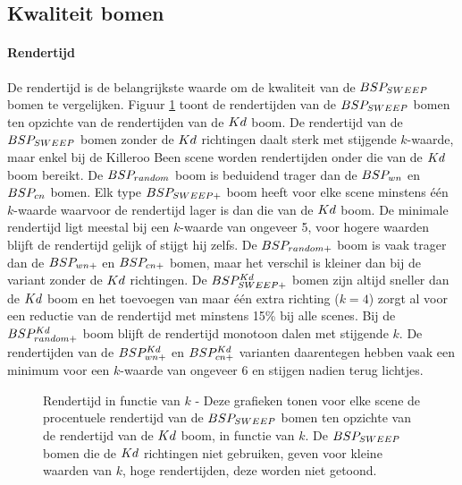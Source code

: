 \subsection{Kwaliteit bomen}
\label{h5-richtingen-kwaliteit}
\paragraph{Rendertijd}
De rendertijd is de belangrijkste waarde om de kwaliteit van de $BSP_{SWEEP}$ bomen te vergelijken. Figuur \ref{fig:k-rendertijd} toont de rendertijden van de $BSP_{SWEEP}$ bomen ten opzichte van de rendertijden van de $Kd$ boom.
De rendertijd van de $BSP_{SWEEP}$ bomen zonder de $Kd$ richtingen daalt sterk met stijgende $k$-waarde, maar enkel bij de Killeroo Been scene worden rendertijden onder die van de $Kd$ boom bereikt.
De $BSP_{random}$ boom is beduidend trager dan de $BSP_{wn}$ en $BSP_{cn}$ bomen.
Elk type $BSP_{SWEEP+}$ boom heeft voor elke scene minstens één $k$-waarde waarvoor de rendertijd lager is dan die van de $Kd$ boom.
De minimale rendertijd ligt meestal bij een $k$-waarde van ongeveer 5, voor hogere waarden blijft de rendertijd gelijk of stijgt hij zelfs.
De $BSP_{random+}$ boom is vaak trager dan de $BSP_{wn+}$ en $BSP_{cn+}$ bomen, maar het verschil is kleiner dan bij de variant zonder de $Kd$ richtingen.
De $BSP^{Kd}_{SWEEP+}$ bomen zijn altijd sneller dan de $Kd$ boom en het toevoegen van maar één extra richting ($k = 4$) zorgt al voor een reductie van de rendertijd met minstens 15\% bij alle scenes.
Bij de $BSP^{Kd}_{random+}$ boom blijft de rendertijd monotoon dalen met stijgende $k$.
De rendertijden van de $BSP^{Kd}_{wn+}$ en $BSP^{Kd}_{cn+}$ varianten daarentegen hebben vaak een minimum voor een $k$-waarde van ongeveer 6 en stijgen nadien terug lichtjes.
\begin{figure}
  \centering
  \begin{subfigure}[t]{.32\linewidth}
    \centering
{}
  \end{subfigure}
  \begin{subfigure}[t]{.32\linewidth}
    \centering
{}
\end{subfigure}
\begin{subfigure}[t]{.32\linewidth}
  \centering
{}
\end{subfigure}
\caption[Rendertijd in functie van $k$]{Rendertijd in functie van $k$ - \small Deze grafieken tonen voor elke scene de procentuele rendertijd van de $BSP_{SWEEP}$ bomen ten opzichte van de rendertijd van de $Kd$ boom, in functie van $k$. De $BSP_{SWEEP}$ bomen die de $Kd$ richtingen niet gebruiken, geven voor kleine waarden van $k$, hoge rendertijden, deze worden niet getoond.}
\label{fig:k-rendertijd}
\end{figure}

